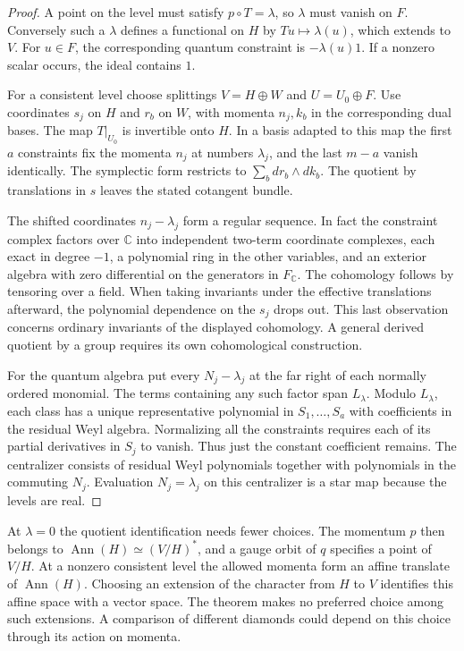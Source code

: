 \documentclass[11pt,letterpaper]{article}
\newcommand{\CC}{\mathbb C}
\begin{document}
\begin{proof}
A point on the level must satisfy $p\circ T=\lambda$, so $\lambda$ must vanish on $F$.
Conversely such a $\lambda$ defines a functional on $H$ by $Tu\mapsto\lambda(u)$, which
extends to $V$. For $u\in F$, the corresponding quantum constraint is $-\lambda(u)1$. If a
nonzero scalar occurs, the ideal contains $1$.

For a consistent level choose splittings $V=H\oplus W$ and $U=U_0\oplus F$. Use coordinates
$s_j$ on $H$ and $r_b$ on $W$, with momenta $n_j,k_b$ in the corresponding dual bases. The map
$T|_{U_0}$ is invertible onto $H$. In a basis adapted to this map the first $a$ constraints
fix the momenta $n_j$ at numbers $\lambda_j$, and the last $m-a$ vanish identically. The
symplectic form restricts to $\sum_b dr_b\wedge dk_b$. The quotient by translations in $s$
leaves the stated cotangent bundle.

The shifted coordinates $n_j-\lambda_j$ form a regular sequence. In fact the constraint
complex factors over $\CC$ into independent two-term coordinate complexes, each exact in
degree $-1$, a polynomial ring in the other variables, and an exterior algebra with zero
differential on the generators in $F_{\CC}$. The cohomology follows by tensoring over a field.
When taking invariants under the effective translations afterward, the polynomial dependence
on the $s_j$ drops out. This last observation concerns ordinary invariants of the displayed
cohomology. A general derived quotient by a group requires its own cohomological construction.

For the quantum algebra put every $N_j-\lambda_j$ at the far right of each normally ordered
monomial. The terms containing any such factor span $L_\lambda$. Modulo $L_\lambda$, each
class has a unique representative polynomial in $S_1,\ldots,S_a$ with coefficients in the
residual Weyl algebra. Normalizing all the constraints requires each of its partial
derivatives in $S_j$ to vanish. Thus just the constant coefficient remains. The centralizer
consists of residual Weyl polynomials together with polynomials in the commuting $N_j$.
Evaluation $N_j=\lambda_j$ on this centralizer is a star map because the levels are real.
\end{proof}

At $\lambda=0$ the quotient identification needs fewer choices. The momentum $p$ then belongs
to $\operatorname{Ann}(H)\simeq(V/H)^*$, and a gauge orbit of $q$ specifies a point of $V/H$.
At a nonzero consistent level the allowed momenta form an affine translate of
$\operatorname{Ann}(H)$. Choosing an extension of the character from $H$ to $V$ identifies
this affine space with a vector space. The theorem makes no preferred choice among such
extensions. A comparison of different diamonds could depend on this choice through its action
on momenta.
\end{document}
